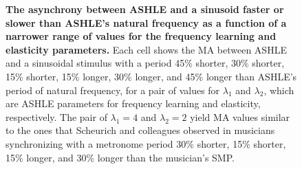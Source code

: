\documentclass[10pt,letterpaper]{article}
\begin{document}
\begin{figure}[!h]
\caption{{\bf The asynchrony between ASHLE and a sinusoid faster or slower than ASHLE's natural frequency as a function of a narrower range of values for the frequency learning and elasticity parameters.} Each cell shows the MA between ASHLE and a sinusoidal stimulus with a period 45\% shorter, 30\% shorter, 15\% shorter, 15\% longer, 30\% longer, and 45\% longer than ASHLE's period of natural frequency, for a pair of values for $\lambda_1$ and $\lambda_2$, which are ASHLE parameters for frequency learning and elasticity, respectively. The pair of $\lambda_1=4$ and $\lambda_2=2$ yield MA values similar to the ones that Scheurich and colleagues \cite{scheurich2018tapping} observed in musicians synchronizing with a metronome period 30\% shorter, 15\% shorter, 15\% longer, and 30\% longer than the musician's SMP.}
\label{fig7}
\end{figure}
\end{document}
